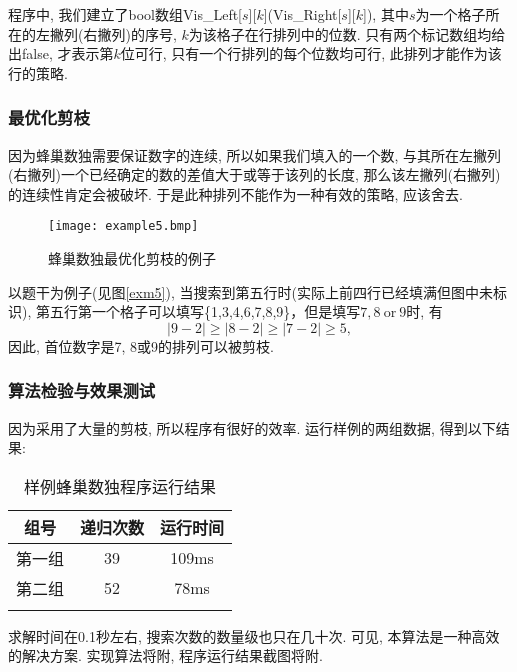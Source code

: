                 程序中, 我们建立了bool数组Vis\_Left[$s$][$k$](Vis\_Right[$s$][$k$]),
                其中$s$为一个格子所在的左撇列(右撇列)的序号,
                $k$为该格子在行排列中的位数.
                只有两个标记数组均给出false, 才表示第$k$位可行,
                只有一个行排列的每个位数均可行, 此排列才能作为该行的策略.

        \subsubsection{最优化剪枝}
            因为蜂巢数独需要保证数字的连续, 所以如果我们填入的一个数,
            与其所在左撇列(右撇列)一个已经确定的数的差值大于或等于该列的长度,
            那么该左撇列(右撇列)的连续性肯定会被破坏.
            于是此种排列不能作为一种有效的策略, 应该舍去.

            \begin{figure}[htb]
                \centering
                \texttt{[image: example5.bmp]}
                \caption[例5]{蜂巢数独最优化剪枝的例子}\label{exm5}
            \end{figure}
            以题干为例子(见图\vref*{exm5}), 当搜索到第五行时(实际上前四行已经填满但图中未标识),
            第五行第一个格子可以填写\{1,3,4,6,7,8,9\}，但是填写$7,8\ \text{or}\ 9$时,
            有\[|9-2|\geq|8-2|\geq|7-2|\geq5,\]
            因此, 首位数字是7, 8或9的排列可以被剪枝.

        \subsubsection{算法检验与效果测试}
            因为采用了大量的剪枝, 所以程序有很好的效率.
            运行样例的两组数据, 得到以下结果:
            \begin{table}
                \begin{center}
                    \caption[蜂巢数独结果]{样例蜂巢数独程序运行结果}
                    \begin{tabular}{ccc}
                        \Xhline{1.2pt}
                        组号  &   递归次数    &   运行时间\\
                        \hline
                        第一组 &   39  &   109ms\\
                        第二组 &   52  &    78ms\\
                        \Xhline{1.2pt}
                    \end{tabular}
                \end{center}
            \end{table}
            求解时间在0.1秒左右, 搜索次数的数量级也只在几十次.
            可见, 本算法是一种高效的解决方案.
            实现算法将附,
            程序运行结果截图将附.

